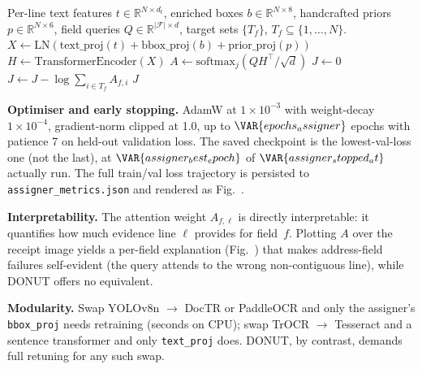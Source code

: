 \begin{algorithm}[!t]
\caption{Multi-instance pos-mass NLL (one receipt).}
\label{alg:posmass}
\begin{algorithmic}[1]
\Require Per-line text features $t\!\in\!\mathbb{R}^{N\times d_t}$,
         enriched boxes $b\!\in\!\mathbb{R}^{N\times 8}$, handcrafted
         priors $p\!\in\!\mathbb{R}^{N\times 6}$, field queries
         $Q\!\in\!\mathbb{R}^{|\mathcal{F}|\times d}$, target sets
         $\{T_f\}$, $T_f\!\subseteq\!\{1,\dots,N\}$.
\State $X \leftarrow \mathrm{LN}(\mathrm{text\_proj}(t)
                              + \mathrm{bbox\_proj}(b)
                              + \mathrm{prior\_proj}(p))$
\State $H \leftarrow \mathrm{TransformerEncoder}(X)$
\State $A \leftarrow \mathrm{softmax}_j(Q H^\top / \sqrt{d})$
\State $J \leftarrow 0$
  \State $J \leftarrow J - \log \sum_{i \in T_f} A_{f,i}$
\EndFor
\State \Return $J$
\end{algorithmic}
\end{algorithm}

\textbf{Optimiser and early stopping.}
AdamW at $1\times 10^{-3}$ with weight-decay $1\times 10^{-4}$,
gradient-norm clipped at 1.0, up to $\VAR{epochs_assigner}$ epochs with
patience 7 on held-out validation loss.  The saved checkpoint is the
lowest-val-loss one (not the last), at
$\VAR{assigner_best_epoch}$ of $\VAR{assigner_stopped_at}$ actually run.
The full train/val loss trajectory is persisted to
\texttt{assigner\_metrics.json} and rendered as
Fig.~.

\textbf{Interpretability.}
The attention weight $A_{f,\ell}$ is directly interpretable:
it quantifies how much evidence line $\ell$ provides for field~$f$.
Plotting $A$ over the receipt image yields a per-field explanation
(Fig.~) that makes address-field failures
self-evident (the query attends to the wrong non-contiguous line),
while DONUT offers no equivalent.

\textbf{Modularity.}
Swap YOLOv8n $\to$ DocTR or PaddleOCR and only the assigner's
\texttt{bbox\_proj} needs retraining (seconds on CPU); swap
TrOCR $\to$ Tesseract and a sentence transformer and only
\texttt{text\_proj} does.  DONUT, by contrast, demands full retuning
for any such swap.

